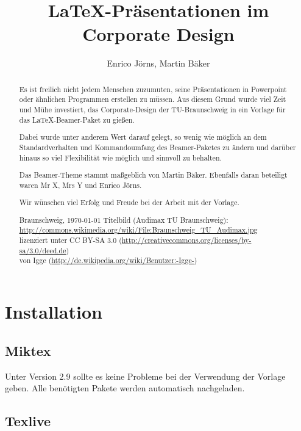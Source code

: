 \documentclass[cmyk,a4paper,11pt,colorscheme=green,TUBStitlepage=picture]{tubsreprt}
\author{Enrico Jörns, Martin Bäker}
\title{LaTeX-Präsentationen im Corporate Design}
\begin{document}
\maketitle

\begin{abstract}
Es ist freilich nicht jedem Menschen zuzumuten, seine Präsentationen in
Powerpoint oder ähnlichen Programmen erstellen zu müssen.
Aus diesem Grund wurde viel Zeit und Mühe investiert, das Corporate-Design der
TU-Braunschweig in ein Vorlage für das \LaTeX-Beamer-Paket zu gießen.\medskip

Dabei wurde unter anderem Wert darauf gelegt, so wenig wie möglich an dem
Standardverhalten und Kommandoumfang des Beamer-Paketes zu ändern und darüber
hinaus so viel Flexibilität wie möglich und sinnvoll zu behalten.\medskip

Das Beamer-Theme stammt maßgeblich von Martin Bäker. Ebenfalls daran beteiligt
waren Mr X, Mrs Y und Enrico Jörns.%
\bigskip

Wir wünschen viel Erfolg und Freude bei der Arbeit mit der Vorlage.
\bigskip

{\hfill Braunschweig, \today}
\vfill
\footnotesize{Titelbild (Audimax TU Braunschweig):\\
\url{http://commons.wikimedia.org/wiki/File:Braunschweig_TU_Audimax.jpg}\\
lizenziert unter CC BY-SA 3.0 (\url{http://creativecommons.org/licenses/by-sa/3.0/deed.de})\\
von Igge (\url{http://de.wikipedia.org/wiki/Benutzer:-Igge-})}
\end{abstract}

\clearpage
\tableofcontents

\chapter{Installation}

\section{Miktex}

Unter Version 2.9 sollte es keine Probleme bei der Verwendung der Vorlage geben.
Alle benötigten Pakete werden automatisch nachgeladen.

\section{Texlive}
\end{document}
